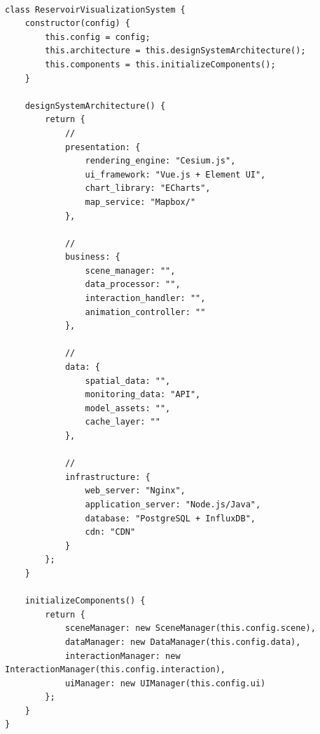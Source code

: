 \hypertarget{section-69}{%
\paragraph{}\label{section-69}}

\begin{lstlisting}[style=javascript]
class ReservoirVisualizationSystem {
    constructor(config) {
        this.config = config;
        this.architecture = this.designSystemArchitecture();
        this.components = this.initializeComponents();
    }
    
    designSystemArchitecture() {
        return {
            // 
            presentation: {
                rendering_engine: "Cesium.js",
                ui_framework: "Vue.js + Element UI",
                chart_library: "ECharts",
                map_service: "Mapbox/"
            },
            
            // 
            business: {
                scene_manager: "",
                data_processor: "", 
                interaction_handler: "",
                animation_controller: ""
            },
            
            // 
            data: {
                spatial_data: "",
                monitoring_data: "API",
                model_assets: "",
                cache_layer: ""
            },
            
            // 
            infrastructure: {
                web_server: "Nginx",
                application_server: "Node.js/Java",
                database: "PostgreSQL + InfluxDB",
                cdn: "CDN"
            }
        };
    }
    
    initializeComponents() {
        return {
            sceneManager: new SceneManager(this.config.scene),
            dataManager: new DataManager(this.config.data),
            interactionManager: new InteractionManager(this.config.interaction),
            uiManager: new UIManager(this.config.ui)
        };
    }
}
\end{lstlisting}

\hypertarget{section-70}{%
\subsubsection{}\label{section-70}}

\hypertarget{section-71}{%
\paragraph{}\label{section-71}}

